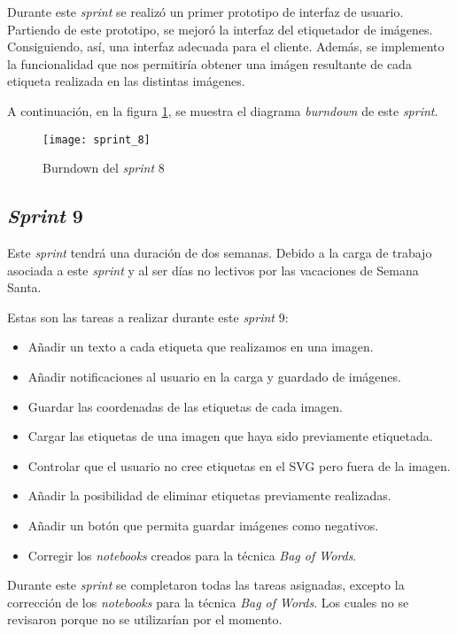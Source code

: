Durante este \textit{sprint} se realizó un primer prototipo de interfaz de  usuario. Partiendo de este prototipo, se mejoró la interfaz del etiquetador de imágenes. Consiguiendo, así, una interfaz adecuada para el cliente. Además, se implemento la funcionalidad que nos permitiría obtener una imágen resultante de cada etiqueta realizada en las distintas imágenes.

A continuación, en la figura \ref{fig:A.1.9}, se muestra el diagrama \textit{burndown} de este \textit{sprint}.

\begin{figure}
\centering
\texttt{[image: sprint\_8]}
\caption{Burndown del \textit{sprint} 8}
\label{fig:A.1.9}
\end{figure}

\subsection{\textit{Sprint} 9}

Este \textit{sprint} tendrá una duración de dos semanas. Debido  a la carga de trabajo asociada a este \textit{sprint} y al ser días no lectivos por las vacaciones de Semana Santa. 

Estas son las tareas a realizar durante este \textit{sprint} 9:

\begin{itemize}
	\item Añadir un texto a cada etiqueta que realizamos en una imagen.
	\item Añadir notificaciones al usuario en la carga y guardado de imágenes.
	\item Guardar las coordenadas de las etiquetas de cada imagen.
	\item Cargar las etiquetas de una imagen que haya sido previamente etiquetada.
	\item Controlar que el usuario no cree etiquetas en el SVG pero fuera de la imagen.
	\item Añadir la posibilidad de eliminar etiquetas previamente realizadas.
	\item Añadir un botón que permita guardar imágenes como negativos.
	\item Corregir los \textit{notebooks} creados para la técnica \textit{Bag of Words}.
\end{itemize}

Durante este \textit{sprint} se completaron todas las tareas asignadas, excepto la corrección de los \textit{notebooks} para la técnica \textit{Bag of Words}. Los cuales no se revisaron porque no se utilizarían por el momento.

